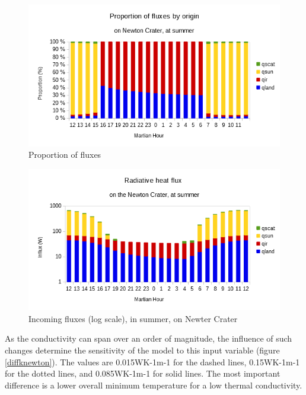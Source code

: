 \documentclass{report}
\begin{document}
\begin{figure}
    \centering
    \includegraphics[width=.9\textwidth]{graphs/0108-newton-q-prop.png}
    \caption{Proportion of fluxes}
    \label{qpropnewton}
\end{figure}{}
\begin{figure}
    \centering
    \includegraphics[width=.9\textwidth]{graphs/0108-newton-q.png}
    \caption{Incoming fluxes (log scale), in summer, on Newter Crater}
    \label{qnewton}
\end{figure}{}

As the conductivity can span over an order of magnitude, the influence of such changes determine the sensitivity of the model to this input variable (figure \ref{diffknewton}). The values are 0.015WK-1m-1 for the dashed lines, 0.15WK-1m-1  for the dotted lines, and 0.085WK-1m-1 for solid lines. The most important difference is a lower overall minimum temperature for a low thermal conductivity. \\
\end{document}
